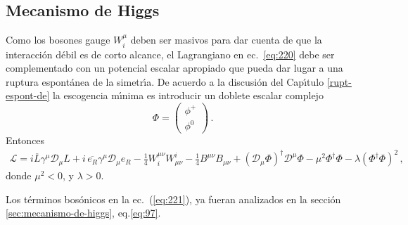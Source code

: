\subsection*{Mecanismo de Higgs}
\label{sec:mecanismo-de-higgs-1}
Como los bosones gauge $W^\mu_i$ deben ser masivos para dar cuenta de que la interacci\'on d\'ebil es de corto alcance, el Lagrangiano en ec.~\eqref{eq:220} debe ser complementado con un potencial escalar apropiado que pueda dar lugar a una ruptura espont\'anea de la simetr\'\i a. De acuerdo a la discusi\'on del Cap\'\i tulo \ref{rupt-espont-de} la escogencia m\'\i nima es introducir un doblete escalar complejo
\begin{equation}
  \Phi=
  \begin{pmatrix}
    \phi^+\\
    \phi^0
  \end{pmatrix}\,.
\end{equation} 
Entonces
\begin{align}
  \label{eq:221}
     \mathcal{L}=i\overline{L}\gamma^\mu\mathcal{D}_\mu L+i\,\overline{e_R}\gamma^\mu\mathcal{D}_\mu e_R
     -\tfrac{1}{4}W^{\mu\nu}_i W_{\mu\nu}^i-\tfrac{1}{4}B^{\mu\nu} B_{\mu\nu}
+(\mathcal{D}_\mu\Phi)^\dagger\mathcal{D}^\mu\Phi-\mu^2\Phi^\dagger\Phi-\lambda(\Phi^\dagger\Phi)^2\,,
\end{align}
donde $\mu^2\lt 0$, y $\lambda\gt 0$.



Los t\'erminos bos\'onicos en la ec.~(\ref{eq:221}), ya fueran analizados en la secci\'on \ref{sec:mecanismo-de-higgs},  eq.\eqref{eq:97}. 

